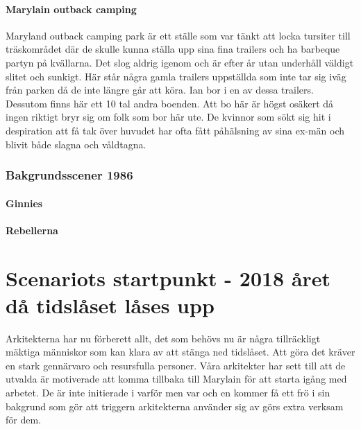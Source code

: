 \documentclass[a5paper,10pt]{report}
\begin{document}
\subsubsection{Marylain outback camping} \label{camping}
Maryland outback camping park är ett ställe som var tänkt att locka tursiter till träskområdet där de skulle kunna ställa upp sina fina trailers och ha barbeque partyn på kvällarna. Det slog aldrig igenom och är efter år utan underhåll väldigt slitet och sunkigt. Här står några gamla trailers uppställda som inte tar sig iväg från parken då de inte längre går att köra. Ian bor i en av dessa trailers. Dessutom finns här ett 10 tal andra boenden. Att bo här är högst osäkert då ingen riktigt bryr sig om folk som bor här ute. De kvinnor som sökt sig hit i despiration att få tak över huvudet har ofta fått påhälsning av sina ex-män och blivit både slagna och våldtagna.
\subsection{Bakgrundsscener 1986}
\subsubsection{Ginnies}
\subsubsection{Rebellerna}
\clearpage
\chapter{Scenariots startpunkt - 2018 året då tidslåset låses upp}
Arkitekterna har nu förberett allt, det som behövs nu är några tillräckligt mäktiga människor som kan klara av att stänga ned tidslåset. Att göra det kräver en stark gennärvaro och resursfulla personer. Våra arkitekter har sett till att de utvalda är motiverade att komma tillbaka till Marylain för att starta igång med arbetet. De är inte initierade i varför men var och en kommer få ett frö i sin bakgrund som gör att triggern arkitekterna använder sig av görs extra verksam för dem.
\end{document}
